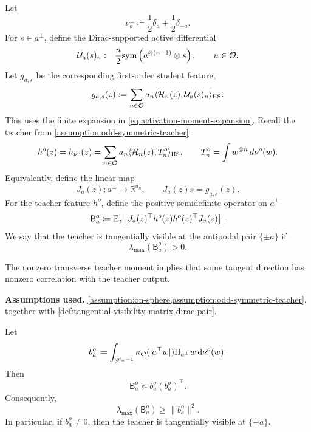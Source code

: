 \begin{definition}
\label{def:tangential-visibility-matrix-dirac-pair}
Let
\[
    \nu_a^\pm
    \coloneq
    \frac12\delta_a+\frac12\delta_{-a}.
\]
For \(s\in a^\perp\), define the Dirac-supported active differential
\[
    \mathcal U_a(s)_n
    \coloneq
    \frac n2
    \mathrm{sym}\left({a^{\otimes(n-1)}\otimes s}\right),
    \qquad n\in\mathcal O.
\]
Let \(g_{a,s}\) be the corresponding first-order student feature,
\begin{equation}
\label{eq:mf-visibility-first-order-feature}
 g_{a,s}(z):=\sum_{n\in\mathcal O}a_n
       \langle\mathcal{H}_n(z),\mathcal U_a(s)_n\rangle_{\rm HS}.
\end{equation}
This uses the finite expansion in \eqref{eq:activation-moment-expansion}.
Recall the teacher from \cref{assumption:odd-symmetric-teacher}:
\[
 h^o(z)=h_{\nu^o}(z)
 =\sum_{n\in\mathcal O}a_n\langle\mathcal{H}_n(z),T_n^o\rangle_{\rm HS},
 \qquad T_n^o=\int w^{\otimes n}\,d\nu^o(w).
\]
Equivalently, define the linear map
\[
    J_a(z):a^\perp\to\mathbb R^{d_h},
    \qquad
    J_a(z)s=g_{a,s}(z).
\]
For the teacher feature \(h^o\), define the positive semidefinite operator
on \(a^\perp\)
\[
    \mathsf B_a^o
    \coloneq
    \mathbb{E}_z
    \left[
        J_a(z)^\top h^o(z)h^o(z)^\top J_a(z)
    \right].
\]
We say that the teacher is tangentially visible at the antipodal pair
\(\{\pm a\}\) if
\[
    \lambda_{\max}(\mathsf B_a^o)>0.
\]
\end{definition}

The nonzero transverse teacher moment implies that some tangent direction has
nonzero correlation with the teacher output.

\begin{lemma}
\label{lem:active-weighted-transverse-moment-implies-visibility}
\textbf{Assumptions used.}
\cref{assumption:on-sphere,assumption:odd-symmetric-teacher},
together with
\cref{def:tangential-visibility-matrix-dirac-pair}.

Let
\[
    b_a^o
    \coloneq
    \int_{\mathbb{S}^{d_w-1}}
    \kappa_{\mathcal O}(|a^\top w|)
    \Pi_{a^\perp}w
    \,\dd\nu^o(w).
\]
Then
\[
    \mathsf B_a^o
    \succeq
    b_a^o(b_a^o)^\top.
\]
Consequently,
\[
    \lambda_{\max}(\mathsf B_a^o)
    \ge
    \|b_a^o\|^2.
\]
In particular, if \(b_a^o\neq0\), then the teacher is tangentially visible at
\(\{\pm a\}\).
\end{lemma}

